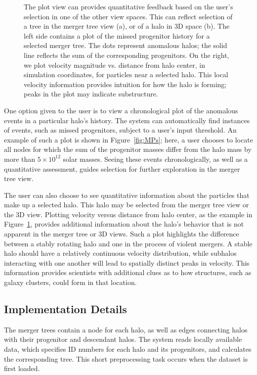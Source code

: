 \begin{figure}[t]
\begin{subfigure}{0.5\textwidth}
        \caption{}
        \label{fig:velocity}
    \end{subfigure}
        \caption{The plot view can provides quantitative feedback based on the user's selection in one of the other view spaces. This can reflect selection of a tree in the merger tree view (a), or of a halo in 3D space (b). The left side contains a plot of the missed progenitor history for a selected merger tree. The dots represent anomalous halos; the solid line reflects the sum of the corresponding progenitors. On the right, we plot velocity magnitude vs. distance from halo center, in simulation coordinates, for particles near a selected halo. This local velocity information provides intuition for how the halo is forming; peaks in the plot may indicate substructure.}\label{fig:plots}
\end{figure}

One option given to the user is to view a chronological plot of the anomalous events in a particular halo's history. The system can automatically find instances of events, such as missed progenitors, subject to a user's input threshold. An example of such a plot is shown in Figure~\ref{fig:MPs};  here, a user chooses to locate all nodes for which the sum of the progenitor masses differ from the halo mass by more than $5 \times 10^{12}$ solar masses. Seeing these events chronologically, as well as a quantitative assessment, guides selection for further exploration in the merger tree view.

The user can also choose to see quantitative information about the particles that make up a selected halo. This halo may be selected from the merger tree view or the 3D view. Plotting velocity versus distance from halo center, as the example in Figure~\ref{fig:velocity}, provides additional information about the halo's behavior that is not apparent in the merger tree or 3D views. Such a plot highlights the difference between a stably rotating halo and one in the process of violent mergers. A stable halo should have a relatively continuous velocity distribution, while subhalos interacting with one another will lead to spatially distinct peaks in velocity. This information provides scientists with additional clues as to how structures, such as galaxy clusters, could form in that location.

\subsection{Implementation Details}
The merger trees contain a node for each halo, as well as edges connecting halos with their progenitor and descendant halos. The system reads locally available data, which specifies ID numbers for each halo and its progenitors, and calculates the corresponding tree. This short preprocessing task occurs when the dataset is first loaded.

